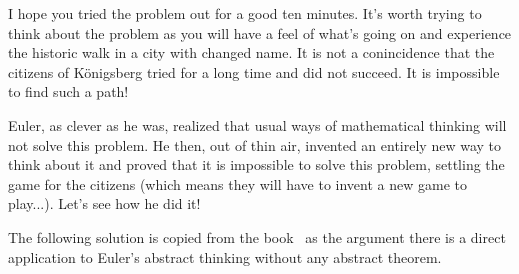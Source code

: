 I hope you tried the problem out for a good ten minutes. 
It's worth trying to think about the problem as you will have a feel of what's going on
and experience the historic walk in a  city with changed name.
It is not a conincidence that the citizens of K\"onigsberg tried for a long time
and did not succeed. It is impossible to find such a path!

Euler, as clever as he was, realized that usual ways of mathematical thinking
will not solve this problem.
He then, out of thin air, invented an entirely new way to think about it and proved that it is impossible to solve this problem, settling the game for the citizens (which means they will have to invent a new game to play...).
Let's see how he did it!

The following solution is copied from the book~\cite{Burger2013} as the argument 
there  is a direct application 
to Euler's abstract thinking without any abstract theorem.

